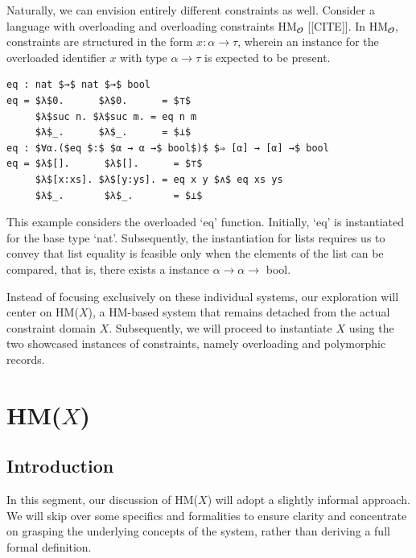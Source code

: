 \documentclass[runningheads]{llncs}
\newcommand{\hmx}{HM($X$)}
\begin{document}
Naturally, we can envision entirely different constraints as well.
Consider a language with overloading and overloading constraints
HM$_𝓞$ [[CITE]].
In HM$_𝓞$, constraints are structured in the form $x : α → τ$,
wherein an instance for the overloaded identifier $x$ with type $α → τ$ is
expected to be present.
\begin{example}
  \begin{lstlisting}
eq : nat $→$ nat $→$ bool
eq = $λ$0.      $λ$0.      = $⊤$
     $λ$suc n. $λ$suc m. = eq n m 
     $λ$_.      $λ$_.      = $⊥$
eq : $∀α.($eq $:$ $α → α →$ bool$)$ $⇒ [α] → [α] →$ bool
eq = $λ$[].      $λ$[].      = $⊤$
     $λ$[x:xs]. $λ$[y:ys]. = eq x y $∧$ eq xs ys
     $λ$_.       $λ$_.       = $⊥$
  \end{lstlisting}
\end{example}
This example considers the overloaded `eq' function.
Initially, `eq' is instantiated for the base type `nat'.
Subsequently, the instantiation for lists requires us to convey that list
equality is feasible only when
the elements of the list can be compared, that is, there exists a instance $α →
  α →$ bool.

Instead of focusing exclusively on these individual systems, our exploration
will center on \hmx{}, a HM-based system that remains detached from
the actual constraint domain $X$.
Subsequently, we will proceed to instantiate $X$ using the two showcased
instances of constraints, namely overloading and polymorphic records.

\section{\hmx{}}

\subsection{Introduction}
In this segment, our discussion of \hmx{} will adopt a slightly informal
approach.
We will skip over some specifics and formalities to ensure clarity and
concentrate on
grasping the underlying concepts of the system, rather than deriving a full
formal definition.
\end{document}
